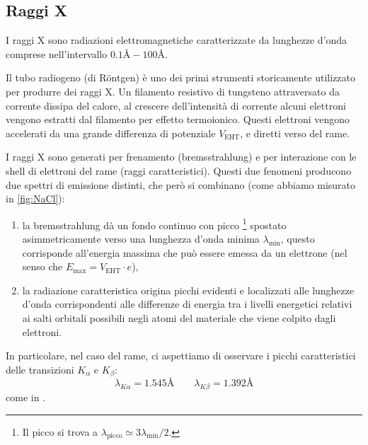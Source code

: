 
\subsection{Raggi X}

I raggi X sono radiazioni elettromagnetiche caratterizzate da lunghezze d'onda comprese nell'intervallo $ 0.1 \unit{\angstrom} - 100 \unit{\angstrom} $.

Il tubo radiogeno (di Röntgen) è uno dei primi strumenti storicamente utilizzato per produrre dei raggi X.
Un filamento resistivo di tungsteno attraversato da corrente dissipa del calore, al crescere dell'intensità di corrente alcuni elettroni vengono estratti dal filamento per effetto termoionico.
Questi elettroni vengono accelerati da una grande differenza di potenziale $ V_\text{EHT} $, e diretti verso del rame.

I raggi X sono generati per frenamento (bremsstrahlung) e per interazione con le shell di elettroni del rame (raggi caratteristici).
Questi due fenomeni producono due spettri di emissione distinti, che però si combinano (come abbiamo misurato in \cref{fig:NaCl}):
\begin{enumerate}
\item la bremsstrahlung dà un fondo continuo con picco \footnote{Il picco si trova a $ \lambda_\text{picco} \simeq 3 \lambda_\text{min} / 2 $.} spostato asimmetricamente verso una lunghezza d'onda minima $ \lambda_\text{min} $, questo corrisponde all'energia massima che può essere emessa da un elettrone (nel senso che $E_\text{max} = V_\text{EHT} \cdot e$),
\item la radiazione caratteristica origina picchi evidenti e localizzati alle lunghezze d'onda corrispondenti alle differenze di energia tra i livelli energetici relativi ai salti orbitali possibili negli atomi del materiale che viene colpito dagli elettroni. 
\end{enumerate}

In particolare, nel caso del rame, ci aspettiamo di osservare i picchi caratteristici delle transizioni $ K_{\alpha} $ e $ K_{\beta} $:
\begin{equation} \label{eq:lambdas}
\lambda_{K\alpha} = 1.545 \unit{\angstrom} \qquad \lambda_{K\beta} = 1.392 \unit{\angstrom}
\end{equation}
come in \cite{xraydatabooklet}.

